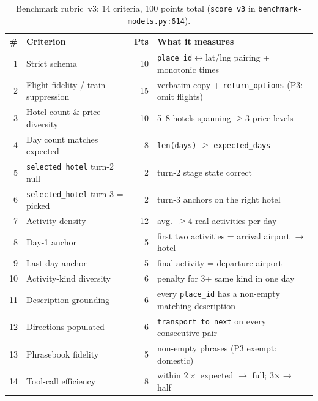 \documentclass{article}
\begin{document}
\begin{table}[t]
\caption{Benchmark rubric~v3: 14 criteria, 100 points total
(\texttt{score\_v3} in \texttt{benchmark-models.py:614}).}
\label{tab:criteria}
\centering
\renewcommand{\arraystretch}{0.95}
\setlength{\tabcolsep}{4pt}
\footnotesize
\begin{tabular}{@{}rlrl@{}}
\toprule
\textbf{\#} & \textbf{Criterion} & \textbf{Pts} & \textbf{What it measures}\\
\midrule
1  & Strict schema                & 10 & \texttt{place\_id}$\leftrightarrow$lat/lng pairing + monotonic times\\
2  & Flight fidelity / train suppression & 15 & verbatim copy + \texttt{return\_options} (P3: omit flights)\\
3  & Hotel count \& price diversity & 10 & 5--8 hotels spanning $\ge$3 price levels\\
4  & Day count matches expected   & 8  & \texttt{len(days)} $\ge$ \texttt{expected\_days}\\
5  & \texttt{selected\_hotel} turn-2 = null & 2  & turn-2 stage state correct\\
6  & \texttt{selected\_hotel} turn-3 = picked & 2  & turn-3 anchors on the right hotel\\
7  & Activity density             & 12 & avg.\ $\ge$4 real activities per day\\
8  & Day-1 anchor                 & 5  & first two activities = arrival airport $\to$ hotel\\
9  & Last-day anchor              & 5  & final activity = departure airport\\
10 & Activity-kind diversity      & 6  & penalty for 3+ same kind in one day\\
11 & Description grounding        & 6  & every \texttt{place\_id} has a non-empty matching description\\
12 & Directions populated         & 6  & \texttt{transport\_to\_next} on every consecutive pair\\
13 & Phrasebook fidelity          & 5  & non-empty phrases (P3 exempt: domestic)\\
14 & Tool-call efficiency         & 8  & within $2\times$ expected $\to$ full; $3\times \to$ half\\
\bottomrule
\end{tabular}
\end{table}
\end{document}
